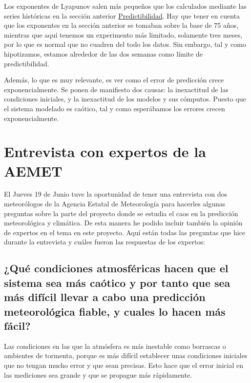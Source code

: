\documentclass[
  10pt,
  a4paper,
  DIV=11,
  numbers=noendperiod,
  open=any]{scrreprt}
\numberwithin{equation}{chapter}
\numberwithin{equation}{section}
\renewcommand{\[}{\begin{equation}}
\renewcommand{\]}{\end{equation}}
\begin{document}
Los exponentes de Lyapunov salen más pequeños que los calculados
mediante las series históricas en la sección anterior
\hyperref[sec-lyapunov]{Predictibilidad}. Hay que tener en cuenta que
los exponentes en la sección anterior se tomaban sobre la base de 75
años, mientras que aquí tenemos un experimento más limitado, solamente
tres meses, por lo que es normal que no cuadren del todo los datos. Sin
embargo, tal y como hipotizamos, estamos alrededor de las dos semanas
como límite de predictibilidad.

Además, lo que es muy relevante, es ver como el error de predicción
crece exponencialmente. Se ponen de manifiesto dos causas: la
inexactitud de las condiciones iniciales, y la inexactitud de los
modelos y sus cómputos. Puesto que el sistema modelado es caótico, tal y
como esperábamos los errores crecen exponencialmente.


\chapter{Entrevista con expertos de la
AEMET}\label{entrevista-con-expertos-de-la-aemet}

El Jueves 19 de Junio tuve la oportunidad de tener una entrevista con
dos meteorólogos de la Agencia Estatal de Meteorología para hacerles
algunas preguntas sobre la parte del proyecto donde se estudia el caos
en la predicción meteorológica y climática. De esta manera he podido
incluir también la opinión de expertos en el tema en este proyecto. Aquí
están todas las preguntas que hice durante la entrevista y cuáles fueron
las respuestas de los expertos:

\section{¿Qué condiciones atmosféricas hacen que el sistema sea más
caótico y por tanto que sea más difícil llevar a cabo una predicción
meteorológica fiable, y cuales lo hacen más
fácil?}\label{quuxe9-condiciones-atmosfuxe9ricas-hacen-que-el-sistema-sea-muxe1s-cauxf3tico-y-por-tanto-que-sea-muxe1s-difuxedcil-llevar-a-cabo-una-predicciuxf3n-meteoroluxf3gica-fiable-y-cuales-lo-hacen-muxe1s-fuxe1cil}

Las condiciones en las que la atmósfera es más inestable como borrascas
o ambientes de tormenta, porque es más difícil establecer unas
condiciones iniciales que no tengan mucho error y que sean precisas.
Esto hace que el error inicial en las mediciones sea grande y que se
propague más rápidamente.
\end{document}
